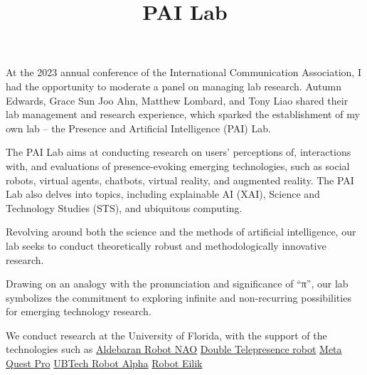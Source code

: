 \documentclass[]{article}
\title{PAI Lab}
\author{}
\date{\vspace{-2.5em}}
\begin{document}
\maketitle

At the 2023 annual conference of the International Communication
Association, I had the opportunity to moderate a panel on managing lab
research. Autumn Edwards, Grace Sun Joo Ahn, Matthew Lombard, and Tony
Liao shared their lab management and research experience, which sparked
the establishment of my own lab -- the Presence and Artificial
Intelligence (PAI) Lab.

The PAI Lab aims at conducting research on users' perceptions of,
interactions with, and evaluations of presence-evoking emerging
technologies, such as social robots, virtual agents, chatbots, virtual
reality, and augmented reality. The PAI Lab also delves into topics,
including explainable AI (XAI), Science and Technology Studies (STS),
and ubiquitous computing.

Revolving around both the science and the methods of artificial
intelligence, our lab seeks to conduct theoretically robust and
methodologically innovative research.

Drawing on an analogy with the pronunciation and significance of ``π'',
our lab symbolizes the commitment to exploring infinite and
non-recurring possibilities for emerging technology research.

We conduct research at the University of Florida, with the support of
the technologies such as
\href{https://www.aldebaran.com/en/nao}{Aldebaran Robot NAO}
\href{https://www.doublerobotics.com/}{Double Telepresence robot}
\href{https://www.meta.com/quest/quest-pro/}{Meta Quest Pro}
\href{https://www.youtube.com/watch?v=7Brb9k1zIso\&t=10s}{UBTech Robot
Alpha} \href{https://energizelab.com/}{Robot Eilik}
\end{document}
